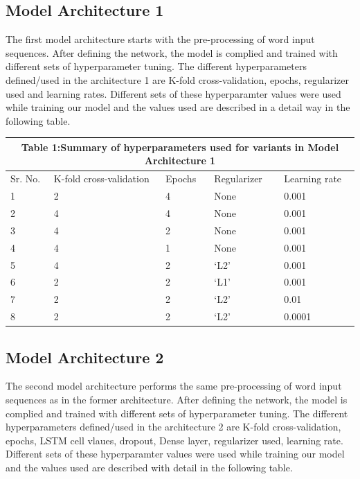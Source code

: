 \documentclass{article}
\begin{document}
\subsection{Model Architecture 1}
The first model architecture starts with the pre-processing of word input sequences. After defining  the network, the model is complied and trained with different sets of hyperparameter tuning. The different hyperparameters defined/used in the architecture 1 are K-fold cross-validation, epochs, regularizer used and learning rates. Different sets of these hyperparamter values were used while training our model and the values used are described in a detail way in the following table.\\

\begin{tabular}[H]{ | p{0.5cm}||p{2cm}||p{2cm}||p{2cm}||p{2.25cm}|}
\hline

 \multicolumn{5}{|c|}{ Table 1:Summary of hyperparameters used for variants in Model Architecture 1 } \\
 \hline
 Sr. No. & K-fold cross-validation & Epochs & Regularizer & Learning rate\\
 \hline
 1 & 2  & 4  & None & 0.001  \\
 2 & 4 & 4  & None & 0.001  \\
 3 & 4 & 2 & None & 0.001  \\
 4 & 4 & 1& None & 0.001  \\
 5 & 4 & 2 & `L2'& 0.001  \\
 6 & 2 & 2 & `L1'& 0.001 \\
 7 & 2 & 2 & `L2'& 0.01 \\
 8 & 2 & 2 & `L2'& 0.0001 \\
 \hline

\end{tabular}

\subsection{Model Architecture 2}

The second model architecture performs the same pre-processing of word input sequences as in the former architecture. After defining  the network, the model is complied and trained with different sets of hyperparameter tuning. The different hyperparameters defined/used in the architecture 2 are K-fold cross-validation, epochs, LSTM cell vlaues, dropout, Dense layer, regularizer used, learning rate. Different sets of these hyperparamter values were used while training our model and the values used are described with detail in the following table.
\end{document}
